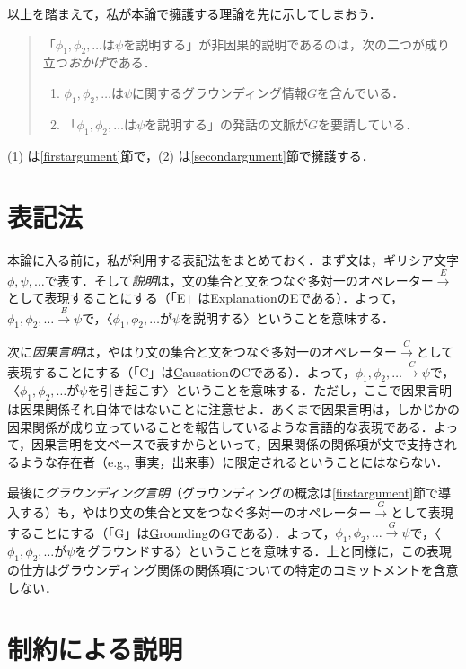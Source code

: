 \documentclass[twoside,12pt,uplatex]{jsarticle}
\theoremstyle{definition}
\begin{document}
以上を踏まえて，私が本論で擁護する理論を先に示してしまおう．
\begin{quote}
「$\phi_1, \phi_2, \ldots$は$\psi$を説明する」が非因果的説明であるのは，次の二つが成り立つ\emph{おかげ}である．
	\begin{enumerate}
	\item $\phi_1, \phi_2, \ldots$は$\psi$に関するグラウンディング情報$G$を含んでいる．	
	\item 「$\phi_1, \phi_2, \ldots$は$\psi$を説明する」の発話の文脈が$G$を要請している．
	\end{enumerate}
\end{quote}

\noindent(1) は\ref{firstargument}節で，(2) は\ref{secondargument}節で擁護する．

\section{表記法}
本論に入る前に，私が利用する表記法をまとめておく．まず文は，ギリシア文字$\phi, \psi, \ldots$で表す．そして\emph{説明}は，文の集合と文をつなぐ多対一のオペレーター$\xrightarrow{E}$として表現することにする（「E」は\underline{E}xplanationのEである）．よって，$\phi_1, \phi_2, \ldots\xrightarrow{E}\psi$で，〈$\phi_1, \phi_2, \ldots$が$\psi$を説明する〉ということを意味する．

次に\emph{因果言明}は，やはり文の集合と文をつなぐ多対一のオペレーター$\xrightarrow{C}$として表現することにする（「C」は\underline{C}ausationのCである）．よって，$\phi_1, \phi_2, \ldots\xrightarrow{C}\psi$で，〈$\phi_1, \phi_2, \ldots$が$\psi$を引き起こす〉ということを意味する．ただし，ここで因果言明は因果関係それ自体ではないことに注意せよ．あくまで因果言明は，しかじかの因果関係が成り立っていることを報告しているような言語的な表現である．よって，因果言明を文ベースで表すからといって，因果関係の関係項が文で支持されるような存在者（e.g., 事実，出来事）に限定されるということにはならない．

最後に\emph{グラウンディング言明}（グラウンディングの概念は\ref{firstargument}節で導入する）も，やはり文の集合と文をつなぐ多対一のオペレーター$\xrightarrow{G}$として表現することにする（「G」は\underline{G}roundingのGである）．よって，$\phi_1, \phi_2, \ldots\xrightarrow{G}\psi$で，〈$\phi_1, \phi_2, \ldots$が$\psi$をグラウンドする〉ということを意味する．上と同様に，この表現の仕方はグラウンディング関係の関係項についての特定のコミットメントを含意しない．

\section{制約による説明}\label{explanationbyconstraint}
\end{document}
